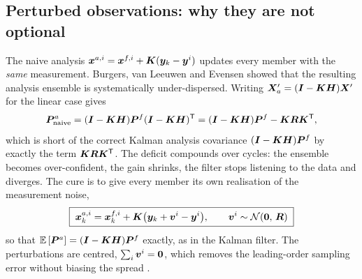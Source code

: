 \subsection{Perturbed observations: why they are not optional}
The naive analysis $\bm{x}^{a,i} = \bm{x}^{f,i} + \bm{K}(\bm{y}_k - \bm{y}^i)$ updates every member with the
\emph{same} measurement.  Burgers, van Leeuwen and Evensen \cite{burgers1998} showed that the
resulting analysis ensemble is systematically under-dispersed.  Writing
$\bm{X}'_a = (\bm{I} - \bm{K}\bm{H})\bm{X}'$ for the linear case gives
\begin{equation}
  \bm{P}^a_{\text{naive}} = (\bm{I}-\bm{K}\bm{H})\bm{P}^f(\bm{I}-\bm{K}\bm{H})^{\mathsf{T}}
  = (\bm{I}-\bm{K}\bm{H})\bm{P}^f - \bm{K}\bm{R}\bm{K}^{\mathsf{T}} ,
  \label{eq:enkf-naive}
\end{equation}
which is short of the correct Kalman analysis covariance $(\bm{I} - \bm{K}\bm{H})\bm{P}^f$ by exactly the term
$\bm{K}\bm{R}\bm{K}^{\mathsf{T}}$.  The deficit compounds over cycles: the ensemble becomes over-confident, the gain
shrinks, the filter stops listening to the data and diverges.  The cure is to give every member its
own realisation of the measurement noise,
\begin{equation}
  \boxed{\;
  \bm{x}^{a,i}_k = \bm{x}^{f,i}_k + \bm{K}\big(\bm{y}_k + \bm{v}^i - \bm{y}^i\big), \qquad \bm{v}^i\sim\mathcal{N}\!\left(\bm 0,\,\bm{R}\right)\;}
  \label{eq:enkf-analysis}
\end{equation}
so that $\mathbb{E}\left[\bm{P}^a\right] = (\bm{I}-\bm{K}\bm{H})\bm{P}^f$ exactly, as in the Kalman filter.  The perturbations are
centred, $\sum_i \bm{v}^i = \bm 0$, which removes the leading-order sampling error without biasing the
spread \cite[\S4.3]{evensen2003}.

